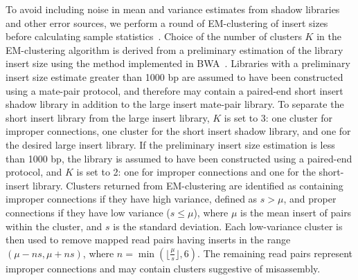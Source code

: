 \documentclass{bioinfo}
\begin{document}
To avoid including noise in mean and variance estimates from shadow libraries and other error sources, 
we perform a round of EM-clustering of insert sizes before calculating sample statistics~\citep{GuptaChen2010}. Choice of 
the number of clusters $K$ in
the EM-clustering algorithm is derived from a preliminary estimation of the library insert size using the method implemented in
BWA~\citep{bwa}. Libraries with a preliminary
insert size estimate greater than 1000 bp are assumed to have been constructed using a mate-pair protocol, and therefore
may contain a paired-end short insert shadow library in addition to the large insert mate-pair library. To separate the short insert library
from the large insert library, $K$ is set to 3: one cluster for improper connections, one cluster for the short insert
shadow library, and one for the desired large insert library. If the preliminary insert size estimation is less than 1000 bp, the library
is assumed to have been constructed using a paired-end protocol, and $K$ is set to 2: one for improper connections
and one for the short-insert library. Clusters returned from EM-clustering are identified as containing improper connections if 
they have high variance, defined as $s > \mu$, and proper connections if they have low variance ($s \le \mu$), where $\mu$ is the mean insert of pairs within
the cluster, and $s$ is the standard deviation. Each low-variance cluster is then used to remove mapped read pairs 
having inserts in the range $(\mu-ns,\mu+ns)$, where $n = \min(\lfloor\frac{\mu}{s}\rfloor, 6)$.  The remaining read
pairs represent improper connections and may contain clusters suggestive of misassembly.
\end{document}

